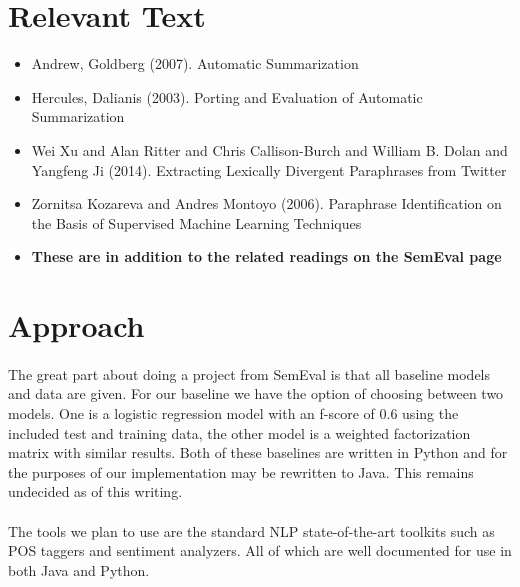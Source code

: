 \documentclass[dvips,12pt]{article}
\begin{document}
\section{Relevant Text}
\begin{itemize}
\item Andrew, Goldberg (2007). Automatic Summarization
\item Hercules, Dalianis (2003). Porting and Evaluation of Automatic Summarization
\item Wei Xu and Alan Ritter and Chris Callison-Burch and William B. Dolan and Yangfeng Ji (2014). Extracting Lexically Divergent Paraphrases from Twitter
\item Zornitsa Kozareva and Andres Montoyo (2006). Paraphrase Identification on the Basis of Supervised Machine Learning Techniques
\item \textbf{These are in addition to the related readings on the SemEval page}
\end{itemize}



\section{Approach}
\paragraph{}
The great part about doing a project from SemEval is that all baseline models and data are given. For our baseline we have the option of choosing between two models. One is a logistic regression model with an f-score of 0.6 using the included test and training data, the other model is a weighted factorization matrix with similar results. Both of these baselines are written in Python and for the purposes of our implementation may be rewritten to Java. This remains undecided as of this writing.

\paragraph{}
The tools we plan to use are the standard NLP state-of-the-art toolkits such as POS taggers and sentiment analyzers. All of which are well documented for use in both Java and Python.
\end{document}
